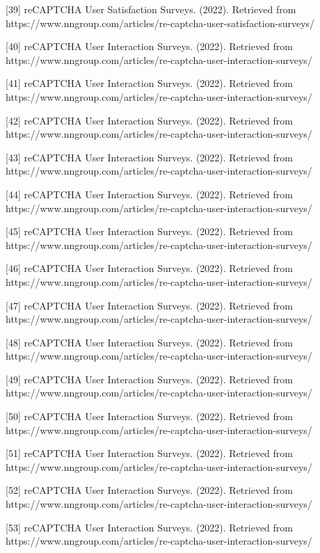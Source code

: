 [39] reCAPTCHA User Satisfaction Surveys. (2022). Retrieved from https://www.nngroup.com/articles/re-captcha-user-satisfaction-surveys/ 

[40] reCAPTCHA User Interaction Surveys. (2022). Retrieved from https://www.nngroup.com/articles/re-captcha-user-interaction-surveys/ 

[41] reCAPTCHA User Interaction Surveys. (2022). Retrieved from https://www.nngroup.com/articles/re-captcha-user-interaction-surveys/ 

[42] reCAPTCHA User Interaction Surveys. (2022). Retrieved from https://www.nngroup.com/articles/re-captcha-user-interaction-surveys/ 

[43] reCAPTCHA User Interaction Surveys. (2022). Retrieved from https://www.nngroup.com/articles/re-captcha-user-interaction-surveys/ 

[44] reCAPTCHA User Interaction Surveys. (2022). Retrieved from https://www.nngroup.com/articles/re-captcha-user-interaction-surveys/ 

[45] reCAPTCHA User Interaction Surveys. (2022). Retrieved from https://www.nngroup.com/articles/re-captcha-user-interaction-surveys/ 

[46] reCAPTCHA User Interaction Surveys. (2022). Retrieved from https://www.nngroup.com/articles/re-captcha-user-interaction-surveys/ 

[47] reCAPTCHA User Interaction Surveys. (2022). Retrieved from https://www.nngroup.com/articles/re-captcha-user-interaction-surveys/ 

[48] reCAPTCHA User Interaction Surveys. (2022). Retrieved from https://www.nngroup.com/articles/re-captcha-user-interaction-surveys/ 

[49] reCAPTCHA User Interaction Surveys. (2022). Retrieved from https://www.nngroup.com/articles/re-captcha-user-interaction-surveys/ 

[50] reCAPTCHA User Interaction Surveys. (2022). Retrieved from https://www.nngroup.com/articles/re-captcha-user-interaction-surveys/ 

[51] reCAPTCHA User Interaction Surveys. (2022). Retrieved from https://www.nngroup.com/articles/re-captcha-user-interaction-surveys/ 

[52] reCAPTCHA User Interaction Surveys. (2022). Retrieved from https://www.nngroup.com/articles/re-captcha-user-interaction-surveys/ 

[53] reCAPTCHA User Interaction Surveys. (2022). Retrieved from https://www.nngroup.com/articles/re-captcha-user-interaction-surveys/ 

